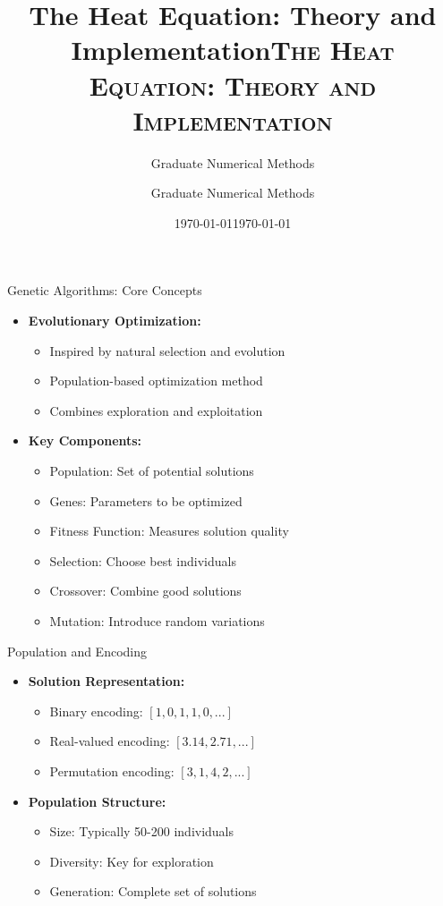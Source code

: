 \documentclass[10pt]{beamer}
\title{The Heat Equation: Theory and Implementation}
\author{Graduate Numerical Methods}
\date{\today}
\title{\textsc{The Heat Equation: Theory and Implementation}}
\author{Graduate Numerical Methods}
\date{\today}
\begin{document}
\begin{frame}
    \titlepage
\end{frame}

\begin{frame}{Genetic Algorithms: Core Concepts}
    \begin{itemize}
        \item \textbf{Evolutionary Optimization:}
        \begin{itemize}
            \item Inspired by natural selection and evolution
            \item Population-based optimization method
            \item Combines exploration and exploitation
        \end{itemize}
        \vspace{0.3cm}
        \item \textbf{Key Components:}
        \begin{itemize}
            \item Population: Set of potential solutions
            \item Genes: Parameters to be optimized
            \item Fitness Function: Measures solution quality
            \item Selection: Choose best individuals
            \item Crossover: Combine good solutions
            \item Mutation: Introduce random variations
        \end{itemize}
    \end{itemize}
\end{frame}

\begin{frame}{Population and Encoding}
    \begin{itemize}
        \item \textbf{Solution Representation:}
        \begin{itemize}
            \item Binary encoding: $[1,0,1,1,0,...]$
            \item Real-valued encoding: $[3.14, 2.71, ...]$
            \item Permutation encoding: $[3,1,4,2,...]$
        \end{itemize}
        \vspace{0.3cm}
        \item \textbf{Population Structure:}
        \begin{itemize}
            \item Size: Typically 50-200 individuals
            \item Diversity: Key for exploration
            \item Generation: Complete set of solutions
        \end{itemize}
    \end{itemize}
\end{frame}
\end{document}
